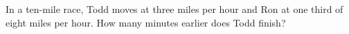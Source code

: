 In a ten-mile race, Todd moves at three miles per hour and Ron at one third of eight miles per hour. How many minutes earlier does Todd finish?
